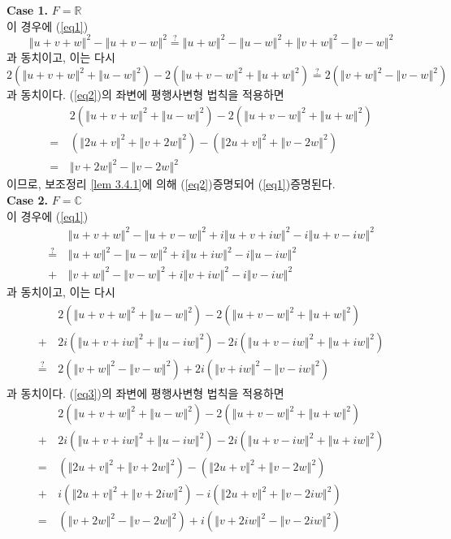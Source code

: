 \documentclass[11pt]{book}
\numberwithin{equation}{chapter}
\def\RR{\mathbb{R}}
\def\CC{\mathbb{C}}
\newcommand{\norm}[1]{\left\Vert#1\right\Vert}
\theoremstyle{definition}
\begin{document}
\noindent\textbf{Case 1.} \(F = \RR\)\\
이 경우에 (\ref{eq1})\은
\[
\norm{u + v + w}^2 - \norm{u + v - w}^2 \stackrel{?}{=} \norm{u+w}^2 - \norm{u-w}^2 + \norm{v+w}^2 - \norm{v-w}^2
\]
과 동치이고, 이는 다시
\begin{equation} \label{eq2}
    2(\norm{u + v + w}^2 + \norm{u-w}^2) - 2(\norm{u + v - w}^2 + \norm{u+w}^2) \stackrel{?}{=} 2(\norm{v+w}^2 - \norm{v-w}^2)
\end{equation}
과 동치이다. (\ref{eq2})의 좌변에 평행사변형 법칙을 적용하면
\begin{align*}
    &2(\norm{u + v + w}^2 + \norm{u-w}^2) - 2(\norm{u + v - w}^2 + \norm{u+w}^2)\\
    =\,&  (\norm{2u + v}^2 + \norm{v + 2w}^2) - (\norm{2u + v}^2 + \norm{v - 2w}^2)\\
    =\,&  \norm{v + 2w}^2 - \norm{v - 2w}^2
\end{align*}
이므로, 보조정리 \ref{lem 3.4.1}에 의해 (\ref{eq2})\가 증명되어 (\ref{eq1})\이 증명된다.\\
\textbf{Case 2.} \(F = \CC\)\\
이 경우에 (\ref{eq1})\은
    \begin{align*}
        &\norm{u+v+w}^2 - \norm{u+v-w}^2 +i\norm{u+v+iw}^2 - i\norm{u+v-iw}^2\\
        \stackrel{?}{=}\,&  \norm{u+w}^2 - \norm{u-w}^2 + i\norm{u+iw}^2 -i\norm{u-iw}^2\\
        +\,&  \norm{v+w}^2 - \norm{v-w}^2 + i\norm{v+iw}^2 -i\norm{v-iw}^2
    \end{align*}
과 동치이고, 이는 다시
    \begin{align} \label{eq3}
        \begin{split}
            &2(\norm{u+v+w}^2 + \norm{u-w}^2) - 2(\norm{u+v-w}^2 + \norm{u+w}^2)\\
            +\,&  2i(\norm{u+v+iw}^2 + \norm{u-iw}^2) - 2i(\norm{u+v-iw}^2 + \norm{u+iw}^2)\\
            \stackrel{?}{=}  \,& 2(\norm{v+w}^2 - \norm{v-w}^2) + 2i(\norm{v+iw}^2 - \norm{v-iw}^2)
        \end{split}
    \end{align}
과 동치이다. (\ref{eq3})의 좌변에 평행사변형 법칙을 적용하면
    \begin{align*}
        &2(\norm{u+v+w}^2 + \norm{u-w}^2) - 2(\norm{u+v-w}^2 + \norm{u+w}^2)\\
        +\,& 2i(\norm{u+v+iw}^2 + \norm{u-iw}^2) - 2i(\norm{u+v-iw}^2 + \norm{u+iw}^2)\\
        =\,& (\norm{2u+v}^2 + \norm{v+2w}^2) - (\norm{2u+v}^2 + \norm{v-2w}^2)\\
        +\,& i(\norm{2u+v}^2 + \norm{v+2iw}^2) - i(\norm{2u+v}^2 + \norm{v-2iw}^2)\\
        =\,& (\norm{v+2w}^2 - \norm{v-2w}^2) + i(\norm{v+2iw}^2 - \norm{v-2iw}^2)
    \end{align*}
\end{document}
